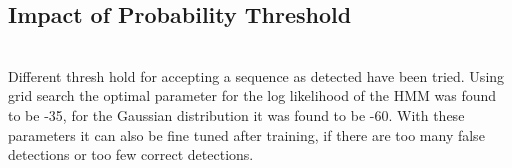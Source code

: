 \documentclass{article}
\begin{document}
\subsection{Impact of Probability Threshold} \\
Different thresh hold for accepting a sequence as detected have been tried. Using grid search the optimal parameter for the log likelihood of the HMM was found to be -35, for the Gaussian distribution it was found to be -60. With these parameters it can also be fine tuned after training, if there are too many false detections or too few correct detections.
\medskip

\small


\end{document}
